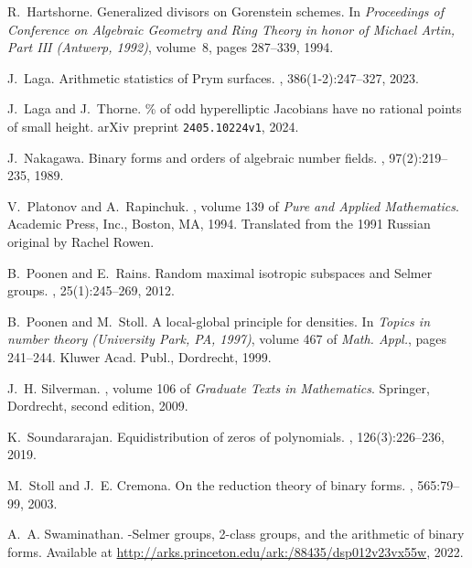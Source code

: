 \documentclass{article} %
\numberwithin{equation}{section}
\begin{document}
\begin{thebibliography}{10}
R.~Hartshorne.
\newblock Generalized divisors on {G}orenstein schemes.
\newblock In {\em Proceedings of {C}onference on {A}lgebraic {G}eometry and
  {R}ing {T}heory in honor of {M}ichael {A}rtin, {P}art {III} ({A}ntwerp,
  1992)}, volume~8, pages 287--339, 1994.

J.~Laga.
\newblock Arithmetic statistics of {P}rym surfaces.
, 386(1-2):247--327, 2023.

J.~Laga and J.~Thorne.
\% of odd hyperelliptic {J}acobians have no rational points of
  small height.
\newblock arXiv preprint \texttt{2405.10224v1}, 2024.

J.~Nakagawa.
\newblock Binary forms and orders of algebraic number fields.
, 97(2):219--235, 1989.

V.~Platonov and A.~Rapinchuk.
, volume 139 of {\em Pure and
  Applied Mathematics}.
\newblock Academic Press, Inc., Boston, MA, 1994.
\newblock Translated from the 1991 Russian original by Rachel Rowen.

B.~Poonen and E.~Rains.
\newblock Random maximal isotropic subspaces and {S}elmer groups.
, 25(1):245--269, 2012.

B.~Poonen and M.~Stoll.
\newblock A local-global principle for densities.
\newblock In {\em Topics in number theory ({U}niversity {P}ark, {PA}, 1997)},
  volume 467 of {\em Math. Appl.}, pages 241--244. Kluwer Acad. Publ.,
  Dordrecht, 1999.

J.~H. Silverman.
, volume 106 of {\em Graduate
  Texts in Mathematics}.
\newblock Springer, Dordrecht, second edition, 2009.

K.~Soundararajan.
\newblock Equidistribution of zeros of polynomials.
, 126(3):226--236, 2019.

M.~Stoll and J.~E. Cremona.
\newblock On the reduction theory of binary forms.
, 565:79--99, 2003.

A.~A. Swaminathan.
-{S}elmer groups, 2-class groups, and the arithmetic of binary
  forms.
\newblock Available at
  \url{http://arks.princeton.edu/ark:/88435/dsp012v23vx55w}, 2022.


\end{thebibliography}
\end{document}
